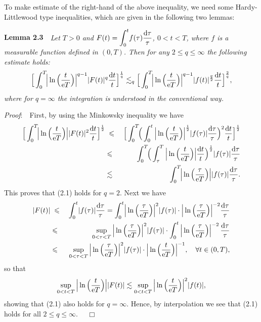 \documentclass[11pt]{article}
\newcommand{\rmd}{\mbox{\rm d}}
\newcommand{\rme}{{\rm e}}
\begin{document}
  To make estimate of the right-hand of the above inequality, we need some Hardy-Littlewood type inequalities, which are given in the following two
  lemmas:
\medskip

  {\bf Lemma 2.3}\ \ {\em Let $T>0$ and $F(t)=\displaystyle\int_0^t\!f(\tau)\frac{\rmd\tau}{\tau}$, $0<t<T$, where $f$ is a measurable function
  defined in $(0,T)$. Then for any $2\leqslant q\leqslant\infty$ the following estimate holds:
\begin{equation}
  \Big[\int_0^T\!\!\Big|\ln\Big(\frac{t}{\rme T}\Big)\Big|^{q-1}|F(t)|^q\frac{\rmd t}{t}\Big]^{\frac{1}{q}}\lesssim_q
  \Big[\int_0^T\!\!\Big|\ln\Big(\frac{t}{\rme T}\Big)\Big|^{q-1}|f(t)|^{\frac{q}{2}}\frac{\rmd t}{t}\Big]^{\frac{2}{q}},
\end{equation}
  where for $q=\infty$ the integration is understood in the conventional way.}
\medskip

  {\em Proof}:\ \ First, by using the Minkowsky inequality we have
\begin{eqnarray*}
  \Big[\int_0^T\!\!\Big|\ln\Big(\frac{t}{\rme T}\Big)\Big||F(t)|^2\frac{\rmd t}{t}\Big]^{\frac{1}{2}}
  &\;\leqslant\;&\Big[\int_0^T\!\!\Big(\int_0^t\Big|\ln\Big(\frac{t}{\rme T}\Big)\Big|^{\frac{1}{2}}|f(\tau)|\frac{\rmd\tau}{\tau}\Big)^2
  \frac{\rmd t}{t}\Big]^{\frac{1}{2}}
\\
  &\leqslant&\int_0^T\!\!\Big(\int_{\tau}^T\Big|\ln\Big(\frac{t}{\rme T}\Big)\Big|\frac{\rmd t}{t}\Big)^{\frac{1}{2}}|f(\tau)|\frac{\rmd\tau}{\tau}
\\
  &\lesssim&\int_0^T\!\!\Big|\ln\Big(\frac{\tau}{\rme T}\Big)\Big||f(\tau)|\frac{\rmd\tau}{\tau}.
\end{eqnarray*}
  This proves that (2.1) holds for $q=2$. Next we have
\begin{eqnarray*}
  |F(t)|&\;\leqslant\;&\int_0^t\!|f(\tau)|\frac{\rmd\tau}{\tau}=\int_0^t\!\Big|\ln\Big(\frac{\tau}{\rme T}\Big)\Big|^2|f(\tau)|\cdot
  \Big|\ln\Big(\frac{\tau}{\rme T}\Big)\Big|^{-2}\frac{\rmd\tau}{\tau}
\\
  &\leqslant&\sup_{0<\tau<T}\Big|\ln\Big(\frac{\tau}{\rme T}\Big)\Big|^2|f(\tau)|\cdot
  \int_0^t\Big|\ln\Big(\frac{\tau}{\rme T}\Big)\Big|^{-2}\,\frac{\rmd\tau}{\tau}
\\
  &\leqslant&\sup_{0<\tau<T}\Big|\ln\Big(\frac{\tau}{\rme T}\Big)\Big|^2|f(\tau)|\cdot\Big|\ln\Big(\frac{t}{\rme T}\Big)\Big|^{-1}, \quad
  \forall t\in (0,T),
\end{eqnarray*}
  so that
$$
  \sup_{0<t<T}\Big|\ln\Big(\frac{t}{\rme T}\Big)\Big||F(t)|\lesssim
  \sup_{0<t<T}\Big|\ln\Big(\frac{t}{\rme T}\Big)\Big|^2|f(t)|,
$$
  showing that (2.1) also holds for $q=\infty$. Hence, by interpolation we see that (2.1) holds for all $2\leqslant q\leqslant\infty$. $\quad\Box$
\medskip
\end{document}
